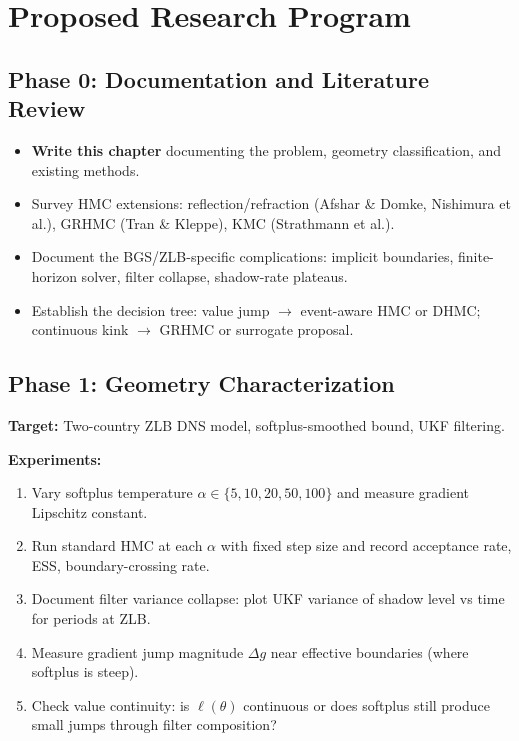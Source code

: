 \section{Proposed Research Program}

\subsection{Phase 0: Documentation and Literature Review}

\begin{itemize}
  \item \textbf{Write this chapter} documenting the problem, geometry
    classification, and existing methods.
  \item Survey HMC extensions: reflection/refraction (Afshar \& Domke,
    Nishimura et al.), GRHMC (Tran \& Kleppe), KMC (Strathmann et al.).
  \item Document the BGS/ZLB-specific complications: implicit boundaries,
    finite-horizon solver, filter collapse, shadow-rate plateaus.
  \item Establish the decision tree: value jump $\to$ event-aware HMC or
    DHMC; continuous kink $\to$ GRHMC or surrogate proposal.
\end{itemize}

\subsection{Phase 1: Geometry Characterization}

\textbf{Target:} Two-country ZLB DNS model, softplus-smoothed bound, UKF
filtering.

\textbf{Experiments:}
\begin{enumerate}
  \item Vary softplus temperature $\alpha \in \{5, 10, 20, 50, 100\}$ and
    measure gradient Lipschitz constant.
  \item Run standard HMC at each $\alpha$ with fixed step size and record
    acceptance rate, ESS, boundary-crossing rate.
  \item Document filter variance collapse: plot UKF variance of shadow level
    vs time for periods at ZLB.
  \item Measure gradient jump magnitude $\Delta g$ near effective boundaries
    (where softplus is steep).
  \item Check value continuity: is $\ell(\theta)$ continuous or does softplus
    still produce small jumps through filter composition?
\end{enumerate}

